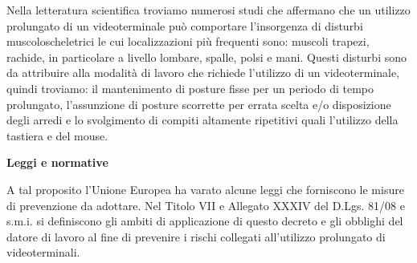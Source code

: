 \documentclass{article}
\begin{document}
Nella letteratura scientifica troviamo numerosi studi che affermano che un utilizzo prolungato di un videoterminale può comportare l’insorgenza di disturbi muscoloscheletrici \cite{rischi} le cui localizzazioni più frequenti sono: muscoli trapezi, rachide, in particolare a livello lombare, spalle, polsi e mani. Questi disturbi sono da attribuire alla modalità di lavoro che richiede l’utilizzo di un videoterminale, quindi troviamo: il mantenimento di posture fisse per un periodo di tempo prolungato, l’assunzione di posture scorrette per errata scelta e/o disposizione degli arredi e lo svolgimento di compiti altamente ripetitivi quali l’utilizzo della tastiera e del mouse.

\bfseries
    Leggi e normative
\mdseries 

A tal proposito l’Unione Europea ha varato alcune leggi che forniscono le misure di prevenzione da adottare. Nel Titolo VII e Allegato XXXIV del D.Lgs. 81/08 e s.m.i. \cite{legge} si definiscono gli ambiti di applicazione di questo decreto e gli obblighi del datore di lavoro al fine di prevenire i rischi collegati all’utilizzo prolungato di videoterminali.
\newpage
\end{document}
